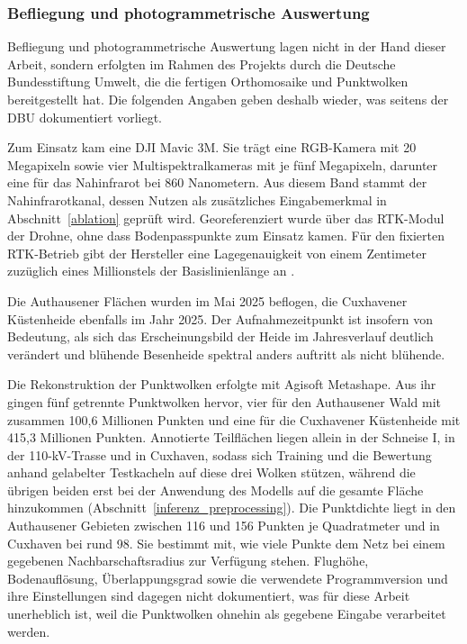 \subsubsection{Befliegung und photogrammetrische Auswertung}\label{datengrundlage}

Befliegung und photogrammetrische Auswertung lagen nicht in der Hand dieser Arbeit, sondern erfolgten im Rahmen des Projekts durch die Deutsche Bundesstiftung Umwelt, die die fertigen Orthomosaike und Punktwolken bereitgestellt hat. Die folgenden Angaben geben deshalb wieder, was seitens der DBU dokumentiert vorliegt.

Zum Einsatz kam eine DJI Mavic 3M. Sie trägt eine RGB-Kamera mit 20 Megapixeln sowie vier Multispektralkameras mit je fünf Megapixeln, darunter eine für das Nahinfrarot bei 860 Nanometern. Aus diesem Band stammt der Nahinfrarotkanal, dessen Nutzen
als zusätzliches Eingabemerkmal in Abschnitt~\ref{ablation} geprüft wird. Georeferenziert wurde über das RTK-Modul der Drohne, ohne dass Bodenpasspunkte zum Einsatz kamen. Für den fixierten RTK-Betrieb gibt der Hersteller eine Lagegenauigkeit von einem Zentimeter zuzüglich eines Millionstels der Basislinienlänge an \cite{DJI.Mavic3M}.

Die Authausener Flächen wurden im Mai 2025 beflogen, die Cuxhavener Küstenheide ebenfalls im Jahr 2025. Der Aufnahmezeitpunkt ist insofern von Bedeutung, als sich das Erscheinungsbild der Heide im Jahresverlauf deutlich verändert und blühende Besenheide spektral anders auftritt als nicht blühende.

Die Rekonstruktion der Punktwolken erfolgte mit Agisoft Metashape. Aus ihr gingen fünf getrennte Punktwolken hervor, vier für den Authausener Wald mit zusammen 100,6 Millionen Punkten und eine für die Cuxhavener Küstenheide mit 415,3 Millionen Punkten. Annotierte Teilflächen liegen allein in der Schneise I, in der 110-kV-Trasse und in Cuxhaven, sodass sich Training und die Bewertung anhand gelabelter Testkacheln auf diese drei Wolken stützen, während die übrigen beiden erst bei der Anwendung des Modells auf die gesamte Fläche hinzukommen (Abschnitt~\ref{inferenz_preprocessing}). Die Punktdichte liegt in den Authausener Gebieten zwischen 116 und 156 Punkten je Quadratmeter und in Cuxhaven bei rund 98. Sie bestimmt mit, wie viele Punkte dem Netz bei einem gegebenen Nachbarschaftsradius zur Verfügung stehen. Flughöhe, Bodenauflösung, Überlappungsgrad sowie die verwendete Programmversion und ihre Einstellungen sind dagegen nicht dokumentiert, was für diese Arbeit unerheblich ist, weil die Punktwolken ohnehin als gegebene Eingabe verarbeitet werden.

